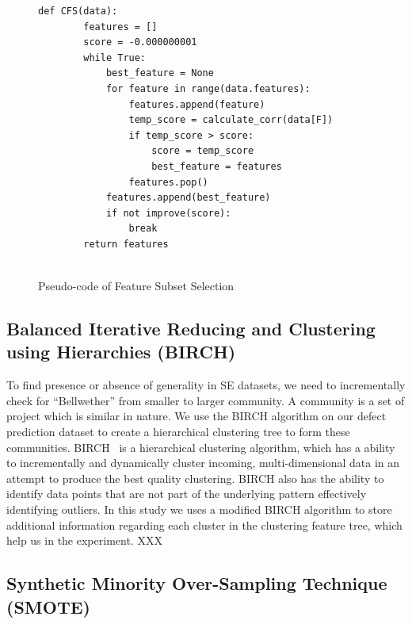 \documentclass[sigconf]{acmart}
\theoremstyle{break}
\begin{document}
\small{
\begin{figure}[]
    \small
     \begin{lstlisting}[mathescape,linewidth=7.5cm,frame=none,numbers=right]
      def CFS(data):
        features = []
        score = -0.000000001
        while True:
            best_feature = None
            for feature in range(data.features):
                features.append(feature)
                temp_score = calculate_corr(data[F])
                if temp_score > score:
                    score = temp_score
                    best_feature = features
                features.pop()
            features.append(best_feature)
            if not improve(score):
                break
        return features
    
    \end{lstlisting} 
    \vspace{-0.2cm}
    \caption{Pseudo-code of Feature Subset Selection}
    \label{fig:GAP_pseudocode} 
    \vspace{-0.3cm}
\end{figure}
}
\subsection{Balanced Iterative Reducing and Clustering using Hierarchies (BIRCH)}
\label{subsec:BIRCH}
To find presence or absence of generality in SE datasets, we need to incrementally check for ``Bellwether'' from smaller to larger community. A community is a set of project which is similar in nature. We use the BIRCH algorithm on our defect prediction dataset to create a hierarchical clustering tree to form these communities. BIRCH~\cite{zhang1996birch} is  a hierarchical clustering algorithm, which has a ability to incrementally and dynamically cluster incoming, multi-dimensional data in an attempt to produce the best quality clustering. BIRCH also has the ability to identify data points that are not part of the underlying pattern effectively identifying outliers. In this study we uses a modified BIRCH algorithm to store additional information regarding each cluster in the clustering feature tree, which help us in the experiment. XXX

\subsection{Synthetic Minority Over-Sampling Technique (SMOTE)}
\label{subsec:SMOTE}
\end{document}
